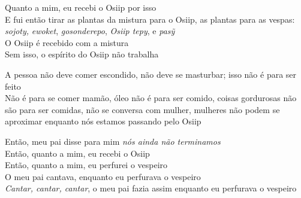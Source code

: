  \smallskip
 \begin{center}\end{center}
 \smallskip
 
\noindent Quanto a mim, eu recebi o Osiip por isso\\
 E fui então tirar as plantas da mistura para o Osiip, as plantas para as vespas: \textit{sojoty,} \textit{ewoket}, \textit{gosonderepo}, \textit{Osiip tepy}, e \textit{pasỹ} \\
 O Osiip é recebido com a mistura\\
 Sem isso, o espírito do Osiip não trabalha
 
 \smallskip
 \begin{center}\end{center}
 \smallskip
 
\noindent A pessoa não deve comer escondido, não deve se masturbar; isso não é
 para ser feito\\
 Não é para se comer mamão, óleo não é para ser comido, coisas
 gordurosas não são para ser comidas, não se conversa com mulher,
 mulheres não podem se aproximar enquanto nós estamos passando pelo
 Osiip
 
 \smallskip
 \begin{center}\end{center}
 \smallskip
 
\noindent Então, meu pai disse para mim \textit{nós ainda não terminamos}\\
 Então, quanto a mim, eu recebi o Osiip\\
 Então, quanto a mim, eu perfurei o vespeiro\\
 O meu pai cantava, enquanto eu perfurava o vespeiro\\
 \textit{Cantar, cantar, cantar}, o meu pai fazia assim enquanto eu perfurava o vespeiro
 
